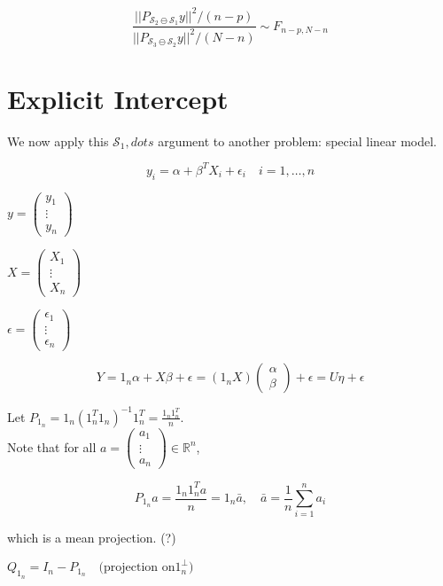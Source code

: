 \documentclass[11pt,fleqn]{book} %
\begin{document}
	$$\frac{||P_{\mathscr{S}_2 \ominus \mathscr{S}_1} y||^2 / (n-p)}{||P_{\mathscr{S}_3 \ominus \mathscr{S}_2} y||^2 / (N - n)} \sim F _{n-p, N-n} $$



 \section{Explicit Intercept}


We now apply this $\mathscr{S}_1, dots $ argument to another problem: special linear model. 

$$y_i = \alpha + \beta^TX_i + \epsilon_i 	\quad i = 1, \dots, n $$

$y = \begin{pmatrix}
	y_1\\
	\vdots\\
	y_n
\end{pmatrix}$

$X = \begin{pmatrix}
	X_1\\
	\vdots\\
	X_n
\end{pmatrix}$

$\epsilon = \begin{pmatrix}
	\epsilon_1\\
	\vdots\\
	\epsilon_n
\end{pmatrix}$

$$Y = 1_n \alpha + X\beta + \epsilon = (1_n X)\begin{pmatrix}
	\alpha\\
	\beta
\end{pmatrix} + \epsilon = U\eta + \epsilon$$

Let $P_{1_n} = 1_n(1_n^T 1_n)^{-1} 1_n^T = \frac{1_n1_n^T}{n}$.\\

Note that for all $a = \begin{pmatrix}
	a_1\\
	\vdots\\
	a_n
\end{pmatrix} \in \mathbb{R}^n$, 

	$$P_{1_n}a = \frac{1_n 1_n^T a}{n} = 1_n \bar{a}, \quad \bar{a}= \frac{1}{n}\displaystyle\sum^n_{i=1}a_i $$

	which is a mean projection. (?)

	$Q_{1_n} = I_n - P_{1_n} \quad \text{(projection on}1_n^\perp\text{)}$\\
\end{document}
